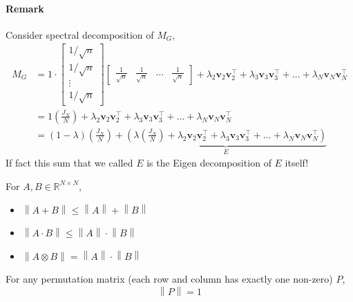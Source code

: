 \documentclass[11pt, letter]{book}
\newcommand{\bv}{\mathbf{v}}
\newcommand{\real}{\mathbb{R}}
\newcommand{\norm}[1]{\left\lVert#1\right\rVert}
\begin{document}
\paragraph{Remark} Consider spectral decomposition of $M_G$,
\begin{align}
	M_G 
	&= 1 \cdot \begin{bmatrix}
		1/\sqrt{n} \\ 1/\sqrt{n} \\ \vdots \\ 1/\sqrt{n}
	\end{bmatrix} \begin{bmatrix}
		\frac{1}{\sqrt{n}} & \frac{1}{\sqrt{n}} & \dots & \frac{1}{\sqrt{n}}
	\end{bmatrix} + \lambda_2 \bv_2 \bv_2^\top + \lambda_3 \bv_3 \bv_3^\top + \dots + \lambda_N \bv_N \bv_N^\top \\
	&= 1 \left( \frac{J_N}{N} \right) + \lambda_2 \bv_2 \bv_2^\top + \lambda_3 \bv_3 \bv_3^\top + \dots + \lambda_N \bv_N \bv_N^\top \\
	&= (1 - \lambda) \left( \frac{J_N}{N} \right) + \underbrace{\left( \lambda \left( \frac{J_N}{N} \right) + \lambda_2 \bv_2 \bv_2^\top + \lambda_3 \bv_3 \bv_3^\top + \dots + \lambda_N \bv_N \bv_N^\top \right)}_{E}
\end{align}
If fact this sum that we called $E$ is the Eigen decomposition of $E$ itself! 

\begin{lemma}
\label{lemma: zig zag la 2}
	For $A, B \in \real^{N \times N}$,
	\begin{itemize}
		\item $\norm{ A + B } \leq \norm {A} + \norm {B}$
		\item $\norm {A \cdot B }  \leq \norm{A} \cdot \norm{B}$
		\item $\norm {A \otimes B} = \norm {A } \cdot \norm {B}$
	\end{itemize}
\end{lemma}

\begin{lemma}
\label{lemma: zig zag la 3}
	For any permutation matrix (each row and column has exactly one non-zero) $P$, 
	\begin{equation}
		\norm {P} = 1
	\end{equation}
\end{lemma}
\end{document}
